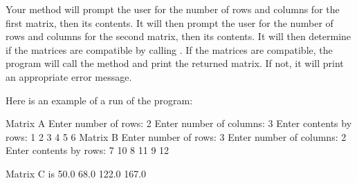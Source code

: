 \begin{exercise}
Your  method will prompt the user for the number of rows and columns for the first matrix, then its contents. It will then prompt the user for the number of rows and columns for the second matrix, then its contents. It will then determine if the matrices are compatible by calling . If the matrices are compatible, the program will call the  method and print the returned matrix. If not, it will print an appropriate error message.

Here is an example of a run of the program:

\begin{stdout}
Matrix A
Enter number of rows: 2
Enter number of columns: 3
Enter contents by rows: 1 2 3 4 5 6
Matrix B
Enter number of rows: 3
Enter number of columns: 2
Enter contents by rows: 7 10 8 11 9 12

Matrix C is
50.0 68.0 
122.0 167.0
\end{stdout}

\end{exercise}


